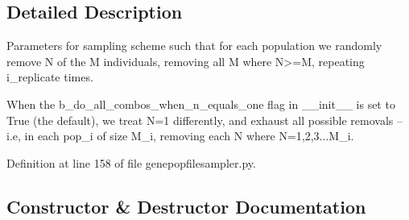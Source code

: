 \subsection{Detailed Description}
\begin{DoxyVerb}Parameters for sampling scheme such that for each population
we randomly remove N of the M individuals, removing all M where
N>=M, repeating i_replicate times. 

When the b_do_all_combos_when_n_equals_one flag in __init__ is
set to True (the default), we treat N=1 differently, and 
exhaust all possible removals -- i.e, in each pop_i 
of size M_i, removing each N where N=1,2,3...M_i.
\end{DoxyVerb}
 

Definition at line 158 of file genepopfilesampler.\+py.



\subsection{Constructor \& Destructor Documentation}
